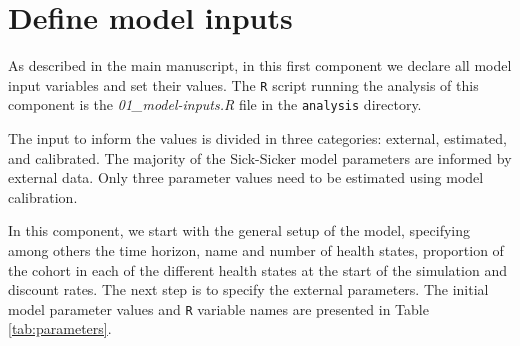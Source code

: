 \documentclass[]{book}
\begin{document}
\hypertarget{inputs}{%
\chapter{Define model inputs}\label{inputs}}

As described in the main manuscript, in this first component we declare all model input variables and set their values. The \texttt{R} script running the analysis of this component is the \emph{01\_model-inputs.R} file in the \texttt{analysis} directory.

The input to inform the values is divided in three categories: external, estimated, and calibrated. The majority of the Sick-Sicker model parameters are informed by external data. Only three parameter values need to be estimated using model calibration.

In this component, we start with the general setup of the model, specifying among others the time horizon, name and number of health states, proportion of the cohort in each of the different health states at the start of the simulation and discount rates. The next step is to specify the external parameters. The initial model parameter values and \texttt{R} variable names are presented in Table \ref{tab:parameters}.
\end{document}
